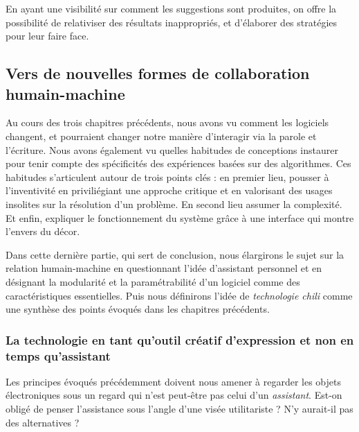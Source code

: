 \documentclass[]{article}
\begin{document}
En ayant une visibilité sur comment les suggestions sont produites, on
offre la possibilité de relativiser des résultats inappropriés, et
d'élaborer des stratégies pour leur faire face.

\newpage

\hypertarget{vers-de-nouvelles-formes-de-collaboration-humain-machine}{%
\subsection{Vers de nouvelles formes de collaboration
humain-machine}\label{vers-de-nouvelles-formes-de-collaboration-humain-machine}}

Au cours des trois chapitres précédents, nous avons vu comment les
logiciels changent, et pourraient changer notre manière d'interagir via
la parole et l'écriture. Nous avons également vu quelles habitudes de
conceptions instaurer pour tenir compte des spécificités des expériences
basées sur des algorithmes. Ces habitudes s'articulent autour de trois
points clés : en premier lieu, pousser à l'inventivité en priviliégiant
une approche critique et en valorisant des usages insolites sur la
résolution d'un problème. En second lieu assumer la complexité. Et
enfin, expliquer le fonctionnement du système grâce à une interface qui
montre l'envers du décor.

Dans cette dernière partie, qui sert de conclusion, nous élargirons le
sujet sur la relation humain-machine en questionnant l'idée d'assistant
personnel et en désignant la modularité et la paramétrabilité d'un
logiciel comme des caractéristiques essentielles. Puis nous définirons
l'idée de \emph{technologie chili} comme une synthèse des points évoqués
dans les chapitres précédents.

\hypertarget{la-technologie-en-tant-quoutil-cruxe9atif-dexpression-et-non-en-temps-quassistant}{%
\subsubsection{La technologie en tant qu'outil créatif d'expression et
non en temps
qu'assistant}\label{la-technologie-en-tant-quoutil-cruxe9atif-dexpression-et-non-en-temps-quassistant}}

Les principes évoqués précédemment doivent nous amener à regarder les
objets électroniques sous un regard qui n'est peut-être pas celui d'un
\emph{assistant}. Est-on obligé de penser l'assistance sous l'angle
d'une visée utilitariste ? N'y aurait-il pas des alternatives ?
\end{document}
